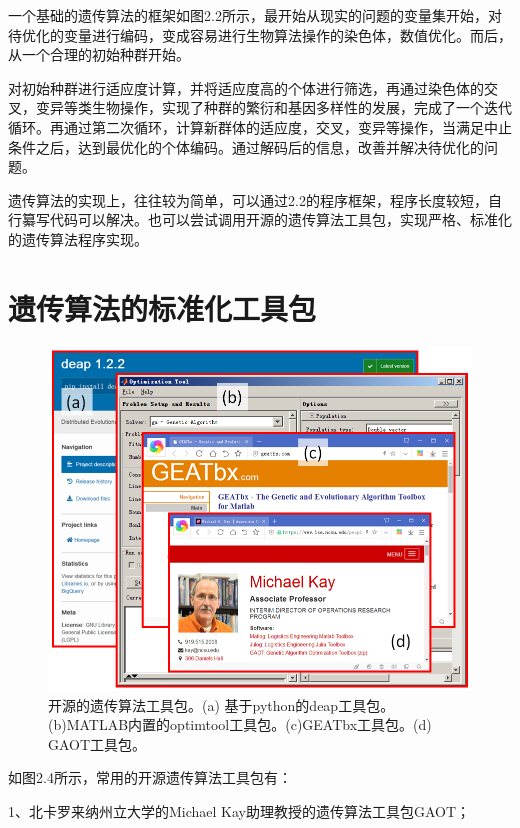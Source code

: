 一个基础的遗传算法的框架如图2.2所示，最开始从现实的问题的变量集开始，对待优化的变量进行编码，变成容易进行生物算法操作的染色体，数值优化。而后，从一个合理的初始种群开始。

对初始种群进行适应度计算，并将适应度高的个体进行筛选，再通过染色体的交叉，变异等类生物操作，实现了种群的繁衍和基因多样性的发展，完成了一个迭代循环。再通过第二次循环，计算新群体的适应度，交叉，变异等操作，当满足中止条件之后，达到最优化的个体编码。通过解码后的信息，改善并解决待优化的问题。

遗传算法的实现上，往往较为简单，可以通过2.2的程序框架，程序长度较短，自行纂写代码可以解决。也可以尝试调用开源的遗传算法工具包，实现严格、标准化的遗传算法程序实现。


\section{遗传算法的标准化工具包}

\begin{figure}[!htbp]
    \centering
    \includegraphics[width=1\textwidth]{Img/2-4.png}
    \caption{开源的遗传算法工具包。(a) 基于python的deap工具包。(b)MATLAB内置的optimtool工具包。(c)GEATbx工具包。(d) GAOT工具包。\cite{kay,geatbx,deap,Matlab}}
    \label{fig:2-4}
\end{figure}

如图2.4所示，常用的开源遗传算法工具包有：

1、北卡罗来纳州立大学的Michael Kay助理教授的遗传算法工具包GAOT；\cite{kay}

